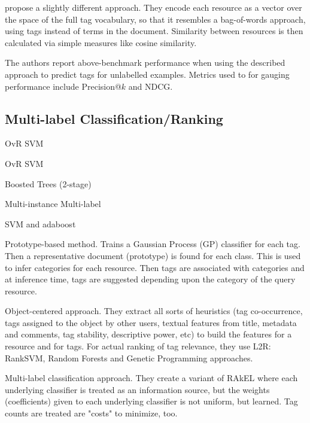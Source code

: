 
\cite{auyeung_etal_2009} propose a slightly different approach. They encode each resource as a vector over the space of the full tag vocabulary, so that it resembles a bag-of-words approach, using tags instead of terms in the document. Similarity between resources is then calculated via simple measures like cosine similarity.

The authors report above-benchmark performance when using the described approach to predict tags for unlabelled examples. Metrics used to for gauging performance include Precision@$k$ and NDCG.


\subsection{Multi-label Classification/Ranking}

\cite{chen_etal_2008} OvR SVM

\cite{katakis_etal_2008} OvR SVM

\cite{bertin-mahieux_etal_2008} Boosted Trees (2-stage)

\cite{song_etal_2008}

\cite{shen_etal_2009} Multi-instance Multi-label

\cite{illig_etal_2011}

\cite{lo_etal_2011} SVM and adaboost

\cite{song_etal_2011} 
Prototype-based method. Trains a Gaussian Process (GP) classifier for each tag. Then a representative document (prototype) is found for each class. This is used to infer categories for each resource. Then tags are associated with categories and at inference time, tags are suggested depending upon the category of the query resource.

\cite{belem_etal_2014}
Object-centered approach. They extract all sorts of heuristics (tag co-occurrence, tags assigned to the object by other users, textual features from title, metadata and comments, tag stability, descriptive power, etc) to build the features for a resource and for tags.
For actual ranking of tag relevance, they use L2R: RankSVM, Random Forests and Genetic Programming approaches.

\cite{lo_etal_2014}
Multi-label classification approach. They create a variant of RAkEL where each underlying classifier is treated as an information source, but the weights (coefficients) given to each underlying classifier is not uniform, but learned.
Tag counts are treated are "costs" to minimize, too.

